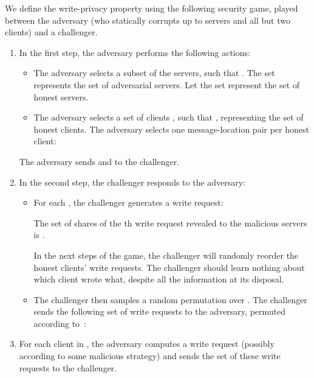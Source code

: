 \documentclass[10pt,twocolumn]{article}
\begin{document}
We define the write-privacy property using the following
security game, played between the adversary (who statically
corrupts up to  servers and all but two clients) and a challenger.
\begin{enumerate}
  \item In the first step, the adversary performs the following actions: 
        \begin{itemize}
            \item The adversary selects 
              a subset 
              of the servers, such that .
              The set  represents the
              set of adversarial servers. 
              Let the set 
              represent the set of honest servers.

            \item The adversary selects a set of clients ,
                  such that , representing the set of honest clients.
                  The adversary selects
                  one message-location pair per honest client:
                

        \end{itemize}
        The adversary sends  and  to the challenger.

  \item In the second step, the challenger responds to the adversary:
        \begin{itemize}
        \item 
        For each , the challenger generates 
        a write request: 
        
        The set of shares of the th write request revealed to the
        malicious servers is .

        In the next steps of the game, the challenger will randomly reorder the honest
        clients' write requests. 
        The challenger should learn nothing about which client wrote what,
        despite all the information at its disposal.

        \item
        The challenger then samples a random permutation  over
        .
        The challenger sends the following set of write requests to the adversary,
        permuted according to~:
        
        \end{itemize}

  \item For each client  in , 
        the adversary computes a write
        request  (possibly according 
        to some malicious strategy) and sends the set of these
        write requests to the challenger.
  

\end{enumerate}
\end{document}
